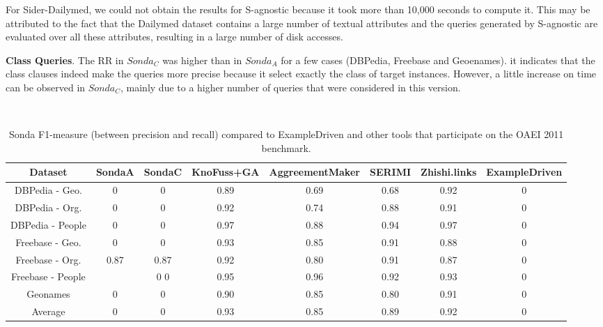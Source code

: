 For Sider-Dailymed, we could not obtain the results for S-agnostic because it took more than 10,000 seconds to compute it. This may be attributed to the fact that the Dailymed dataset contains a large number of textual attributes and the queries generated by S-agnostic are evaluated over all these attributes, resulting in a large number of disk accesses.

\textbf{Class Queries}. The RR in $Sonda_C$ was higher than in $Sonda_A$ for a few cases (DBPedia, Freebase and Geoenames). it indicates that the class clauses indeed make the queries more precise because it select exactly the class of target instances. However, a little increase on time can be observed in $Sonda_C$, mainly due to a higher number of queries that were considered in this version.

\begin{center}
\begin{table*}[ht]
\centering
\scriptsize\tt
\caption{Sonda F1-measure (between precision and recall) compared to ExampleDriven and other tools that participate on the OAEI 2011 benchmark.} 
\begin{tabular}{|c|c|c|c|c|c|c|c|}
\hline
Dataset  &  SondaA  &  SondaC & KnoFuss+GA & AggreementMaker & SERIMI & Zhishi.links & ExampleDriven\\ \hline
DBPedia - Geo. & 0 & 0  & 0.89 & 0.69 & 0.68 & 0.92 & 0 \\ \hline
DBPedia - Org. & 0& 0 & 0.92 & 0.74 & 0.88 & 0.91 & 0\\ \hline
DBPedia - People & 0 & 0 & 0.97 & 0.88 & 0.94 & 0.97 & 0\\ \hline
Freebase - Geo. & 0 & 0 & 0.93 & 0.85 & 0.91 & 0.88 & 0\\ \hline
Freebase - Org. & 0.87 & 0.87 & 0.92 & 0.80 & 0.91 & 0.87 & 0\\ \hline
Freebase - People & & 0 0 & 0.95 & 0.96 & 0.92 & 0.93 & 0\\ \hline
Geonames & 0 & 0  & 0.90 & 0.85 & 0.80 & 0.91 & 0\\ \hline
Average & 0 & 0  & 0.93 & 0.85 & 0.89 &  0.92 & 0\\ \hline											 
\end{tabular}  
\end{table*} 
\end{center}

